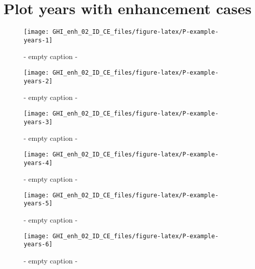 \documentclass[
  10pt,
  a4paper,oneside]{article}
\begin{document}
\newpage
\FloatBarrier

\hypertarget{plot-years-with-enhancement-cases}{%
\section{Plot years with enhancement cases}\label{plot-years-with-enhancement-cases}}

\begin{figure}[H]

{\centering \texttt{[image: GHI\_enh\_02\_ID\_CE\_files/figure-latex/P-example-years-1]} 

}

\caption{ - empty caption - }\label{fig:P-example-years-1}
\end{figure}
\begin{figure}[H]

{\centering \texttt{[image: GHI\_enh\_02\_ID\_CE\_files/figure-latex/P-example-years-2]} 

}

\caption{ - empty caption - }\label{fig:P-example-years-2}
\end{figure}
\begin{figure}[H]

{\centering \texttt{[image: GHI\_enh\_02\_ID\_CE\_files/figure-latex/P-example-years-3]} 

}

\caption{ - empty caption - }\label{fig:P-example-years-3}
\end{figure}
\begin{figure}[H]

{\centering \texttt{[image: GHI\_enh\_02\_ID\_CE\_files/figure-latex/P-example-years-4]} 

}

\caption{ - empty caption - }\label{fig:P-example-years-4}
\end{figure}
\begin{figure}[H]

{\centering \texttt{[image: GHI\_enh\_02\_ID\_CE\_files/figure-latex/P-example-years-5]} 

}

\caption{ - empty caption - }\label{fig:P-example-years-5}
\end{figure}
\begin{figure}[H]

{\centering \texttt{[image: GHI\_enh\_02\_ID\_CE\_files/figure-latex/P-example-years-6]} 

}

\caption{ - empty caption - }\label{fig:P-example-years-6}
\end{figure}
\end{document}
